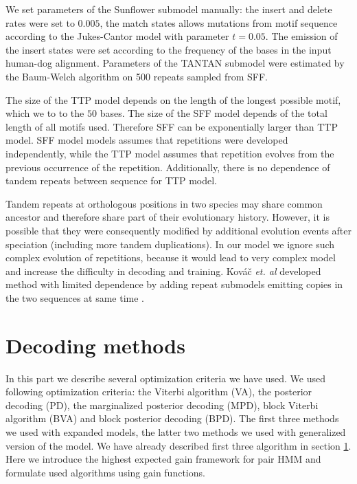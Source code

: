 We set parameters of the Sunflower submodel manually: the insert and delete
rates were set to $0.005$, the match states allows mutations from motif
sequence according to the Jukes-Cantor model with parameter $t=0.05$. The
emission of the insert states were set according to the frequency of the bases
in the input human-dog alignment.  Parameters of the TANTAN submodel were
estimated by the Baum-Welch algorithm \cite{Durbin1998} on 500 repeats sampled
from SFF.

The size of the TTP model depends on the length of the longest possible motif,
which we to to the $50$ bases. The size of the SFF model depends of the total
length of all motifs used. Therefore SFF can be exponentially larger than TTP
model. SFF model models assumes that repetitions were developed independently,
while the TTP model assumes that repetition evolves from the previous
occurrence of the repetition. Additionally, there is no dependence of tandem
repeats between sequence for TTP model.

Tandem repeats at orthologous positions in two species may share common
ancestor and therefore share part of their evolutionary history. However, it is
possible that they were consequently modified by additional evolution events
after speciation (including more tandem duplications). In our model we ignore
such complex evolution of repetitions, because it would lead to very complex
model and increase the difficulty in decoding and training. Kováč {\it et. al}
developed method with limited dependence by adding repeat submodels emitting
copies in the two sequences at same time \cite{Kovac2012}.

\section{Decoding methods}
In this part we describe several optimization criteria we have used. We used
following optimization criteria: the Viterbi algorithm (VA), the
posterior decoding (PD), the marginalized posterior decoding (MPD), block
Viterbi algorithm (BVA) and block posterior decoding (BPD). The first three
methods we used with expanded models, the latter two methods we used with
generalized version of the model. We have already described first three
algorithm in section \ref{}. Here we introduce the highest expected gain
framework for pair HMM and formulate used algorithms using gain
functions.

